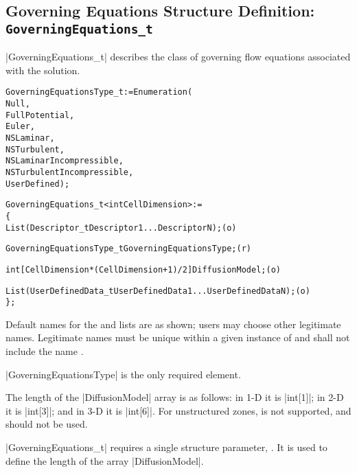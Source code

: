 \subsection{Governing Equations Structure Definition: \texttt{GoverningEquations\_t}}
\label{s:GoverningEquations}

|GoverningEquations_t| describes the class of governing flow equations
associated with the solution.  
\begin{alltt}
  GoverningEquationsType\_t := Enumeration(
    Null,
    FullPotential,
    Euler,                     
    NSLaminar,
    NSTurbulent,
    NSLaminarIncompressible,
    NSTurbulentIncompressible,
    UserDefined ) ;

  GoverningEquations\_t< int CellDimension > :=
    \{
    List( Descriptor\_t Descriptor1 ... DescriptorN ) ;                      (o)

    GoverningEquationsType\_t GoverningEquationsType ;                       (r)
    
    int[CellDimension*(CellDimension + 1)/2] DiffusionModel ;               (o)

    List( UserDefinedData\_t UserDefinedData1 ... UserDefinedDataN ) ;       (o)
    \} ;
\end{alltt}

\begin{notes}
\item
 Default names for the  and
 lists are as shown; users may choose other legitimate names.
 Legitimate names must be unique within a given instance of
  and shall not include the name
 .
\item
 |GoverningEquationsType| is the only required element.
\item
 The length of the |DiffusionModel| array is as follows: in 1-D it is
 |int[1]|; in 2-D it is |int[3]|; and in 3-D it is |int[6]|.
 For unstructured zones,  is not supported, and
 should not be used.
\end{notes}

|GoverningEquations_t| requires a single structure parameter,
.
It is used to define the length of the array |DiffusionModel|.

